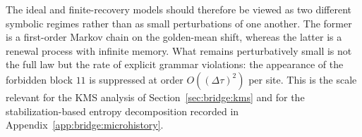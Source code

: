 \begin{remark}\label{rem:grammar-summary}
The ideal and finite-recovery models should therefore be viewed as two different symbolic regimes rather than as small perturbations of one another. The former is a first-order Markov chain on the golden-mean shift, whereas the latter is a renewal process with infinite memory. What remains perturbatively small is not the full law but the rate of explicit grammar violations: the appearance of the forbidden block $11$ is suppressed at order $O((\Delta\tau)^2)$ per site. This is the scale relevant for the KMS analysis of Section~\ref{sec:bridge:kms} and for the stabilization-based entropy decomposition recorded in Appendix~\ref{app:bridge:microhistory}.
\end{remark}
